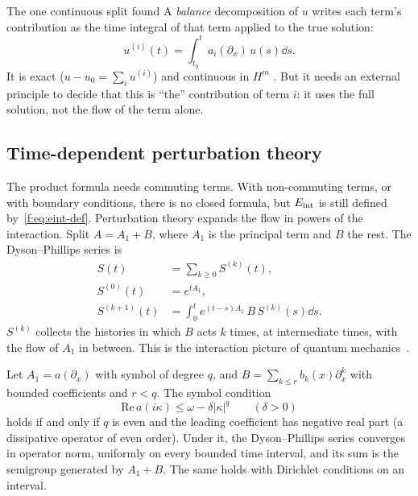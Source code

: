 \begin{aside}{The one continuous split found}
A \emph{balance} decomposition of $u$ writes each term's contribution as the time integral of that term applied to the true solution:
\[
u^{(i)}(t)=\int_{t_0}^{t}a_i(\partial_x)\,u(s)\dd s .
\]
It is exact ($u-u_0=\sum_iu^{(i)}$) and continuous in $H^m$  \pw. But it needs an external principle to decide that this is ``the'' contribution of term $i$: it uses the full solution, not the flow of the term alone.
\end{aside}

\subsection{Time-dependent perturbation theory}

The product formula needs commuting terms. With non-commuting terms, or with boundary conditions, there is no closed formula, but $E_{\mathrm{int}}$ is still defined by~\eqref{f:eq:eint-def}. Perturbation theory expands the flow in powers of the interaction. Split $A=A_1+B$, where $A_1$ is the principal term and $B$ the rest. The Dyson--Phillips series is
\begin{equation}\label{f:eq:dyson}
\begin{aligned}
S(t)&=\sum_{k\ge0}S^{(k)}(t),\\
S^{(0)}(t)&=e^{tA_1},\\
S^{(k+1)}(t)&=\int_0^te^{(t-s)A_1}\,B\,S^{(k)}(s)\dd s .
\end{aligned}
\end{equation}
$S^{(k)}$ collects the histories in which $B$ acts $k$ times, at intermediate times, with the flow of $A_1$ in between. This is the interaction picture of quantum mechanics~\cite{dy}.

\begin{theorem}\label{thm:dyson}
Let $A_1=a(\partial_x)$ with symbol of degree $q$, and $B=\sum_{k\le r}b_k(x)\partial_x^k$ with bounded coefficients and $r<q$. The symbol condition
\[
\mathrm{Re}\,a(i\kappa)\le\omega-\delta|\kappa|^q\qquad(\delta>0)
\]
holds if and only if $q$ is even and the leading coefficient has negative real part (a dissipative operator of even order). Under it, the Dyson--Phillips series converges in operator norm, uniformly on every bounded time interval, and its sum is the semigroup generated by $A_1+B$. The same holds with Dirichlet conditions on an interval.

\end{theorem}

